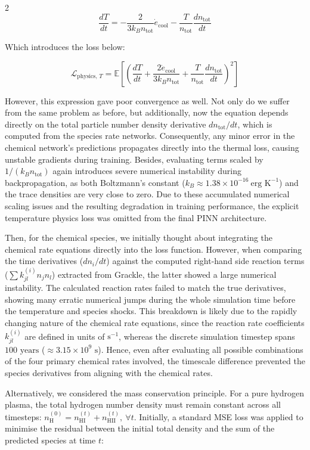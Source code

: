 \documentclass[10pt,a4paper]{article}
\begin{document}
\begin{multicols}{2}
\[
\frac{dT}{dt} = -\frac{2}{3k_B n_{\text{tot}}}\dot{e}_{\text{cool}} - \frac{T}{n_{\text{tot}}} \frac{dn_{\text{tot}}}{dt}
\]

Which introduces the loss below:

\[
\mathcal{L}_{\text{physics, } T} = \mathbb{E}\left[\left(\frac{dT}{dt} + \frac{2\dot{e}_{\text{cool}}}{3k_B n_{\text{tot}}} + \frac{T}{n_{\text{tot}}}\frac{dn_{\text{tot}}}{dt}\right)^2\right]
\]

However, this expression gave poor convergence as well. Not only do we suffer from the same problem as before, but additionally, now the equation depends directly on the total particle number density derivative $dn_{\text{tot}}/dt$, which is computed from the species rate networks. Consequently, any minor error in the chemical network's predictions propagates directly into the thermal loss, causing unstable gradients during training. Besides, evaluating terms scaled by $1/(k_B n_{\text{tot}})$ again introduces severe numerical instability during backpropagation, as both Boltzmann's constant ($k_B \approx 1.38 \times 10^{-16} \ \text{erg K}^{-1}$) and the trace densities are very close to zero. Due to these accumulated numerical scaling issues and the resulting degradation in training performance, the explicit temperature physics loss was omitted from the final PINN architecture.

Then, for the chemical species, we initially thought about integrating the chemical rate equations directly into the loss function. However, when comparing the time derivatives ($dn_i/dt$) against the computed right-hand side reaction terms ($\sum k_{jl}^{(i)}n_jn_l$) extracted from Grackle, the latter showed a large numerical instability. The calculated reaction rates failed to match the true derivatives, showing many erratic numerical jumps during the whole simulation time before the temperature and species shocks. This breakdown is likely due to the rapidly changing nature of the chemical rate equations, since the reaction rate coefficients $k_{jl}^{(i)}$ are defined in units of $\text{s}^{-1}$, whereas the discrete simulation timestep spans $100\text{ years}$ ($\approx 3.15 \times 10^9\text{ s}$). Hence, even after evaluating all possible combinations of the four primary chemical rates involved, the timescale difference prevented the species derivatives from aligning with the chemical rates.

Alternatively, we considered the mass conservation principle. For a pure hydrogen plasma, the total hydrogen number density must remain constant across all timesteps: $n_{\text{H}}^{(0)} = n_{\mathrm{HI}}^{(t)} + n_{\mathrm{HII}}^{(t)}, \ \forall t$. Initially, a standard MSE loss was applied to minimise the residual between the initial total density and the sum of the predicted species at time $t$:


\end{multicols}
\end{document}
